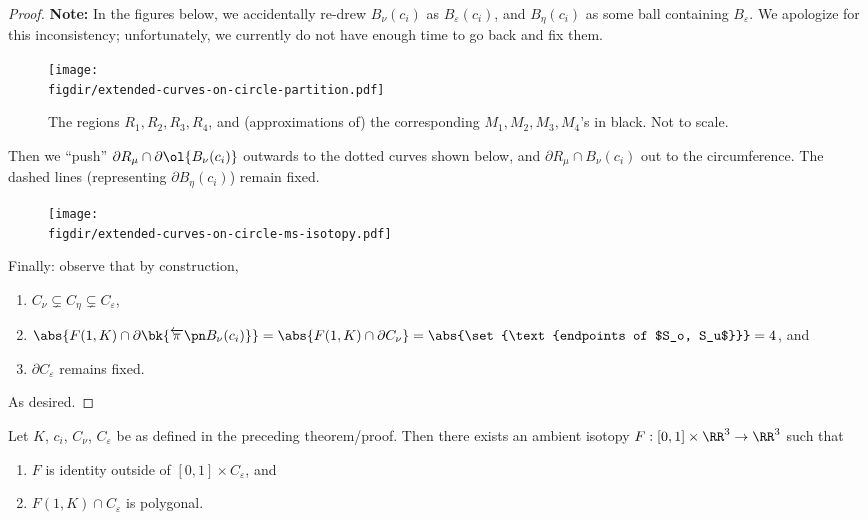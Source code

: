 \begin{proof}
  \textbf{Note:} In the figures below, we accidentally re-drew
  $B_\nu(c_i)$ as $B_\varepsilon(c_i)$, and $B_\eta(c_i)$ as some ball
  containing $B_\varepsilon$. We apologize for this inconsistency;
  unfortunately, we currently do not have enough time to go back and
  fix them.
  \begin{figure}[H]
    \centering
    \texttt{[image: \\figdir/extended-curves-on-circle-partition.pdf]}
    \caption{The regions $R_1, R_2, R_3, R_4$, and (approximations
      of) the corresponding $M_1, M_2, M_3, M_4$'s in black. Not to
      scale.}
    \label{fig:part-disjoint-regions}
  \end{figure}
  Then we ``push'' $\partial R_\mu \cap \partial \ol{B_\nu(c_i)}$
  outwards to the dotted curves shown below, and $\partial R_\mu \cap
  B_\nu(c_i)$ out to the circumference. The dashed lines (representing
  $\partial B_\eta(c_i)$) remain fixed.
  \begin{figure}[H]
    \centering
    \texttt{[image: \\figdir/extended-curves-on-circle-ms-isotopy.pdf]}
  \end{figure}
  Finally: observe that by construction,
  \begin{enumerate}
    \item $C_\nu \subsetneq C_\eta \subsetneq C_\varepsilon$,
    \item $\abs{F(1, K) \cap \partial\bk{\fpre{\pi}{B_\nu(c_i)}}} =
      \abs{F(1,K) \cap \partial C_\nu} = \abs{\set{\text{endpoints of
      $S_o, S_u$}}} = 4$, and
    \item $\partial C_\varepsilon$ remains fixed.
  \end{enumerate}
  As desired.
\end{proof}
\begin{corollary}
  Let $K$, $c_i$, $C_\nu$, $C_\varepsilon$ be as defined in the
  preceding theorem/proof. Then there exists an ambient isotopy $F :
  [0,1] \times \RR^3 \to \RR^3$ such that
  \begin{enumerate}
    \item $F$ is identity outside of $[0,1] \times C_\varepsilon$, and
    \item $F(1, K) \cap C_\varepsilon$ is polygonal.
  \end{enumerate}
\end{corollary}
